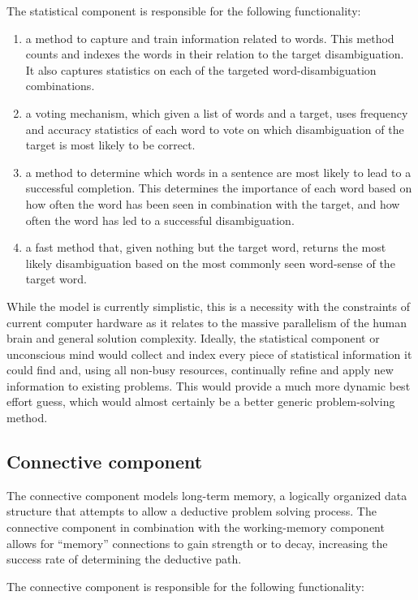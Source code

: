 The statistical component is responsible for the following functionality:

\begin{enumerate}     
	\item a method to capture and train information related to words.  
	This method counts and indexes the words in their relation to the 
	target disambiguation. It also captures statistics on each of the 
	targeted word-disambiguation combinations.     
	\item a voting mechanism, which given a list of words and a target, uses 
	frequency and accuracy statistics of each word to vote on which disambiguation 
	of the target is most likely to be correct.
	\item a method to determine which words in a sentence are most likely to 
	lead to a successful completion.  This determines the importance of each 
	word based on how often the word has been seen in combination with the target,
	and how often the word has led to a successful disambiguation.     
	\item a fast method that, given nothing but the target word, returns the most likely disambiguation based on the most commonly seen word-sense of the target word.
\end{enumerate}

While the model is currently simplistic, this is a necessity with the constraints of current computer
hardware as it relates to the massive parallelism of the human brain and general
solution complexity.  Ideally, the statistical component or unconscious mind
would collect and index every piece of statistical information it could find 
and, using all non-busy resources, continually refine and apply new information
to existing problems.  This would provide a much more dynamic best effort guess, which would almost
certainly be a better generic problem-solving method.

\subsection{Connective component} 

The connective component models long-term
memory, a logically organized data structure that attempts to allow a deductive
problem solving process.  The connective component in combination with the
working-memory component allows for ``memory'' connections to gain strength or
to decay, increasing the success rate of determining the deductive path.

The connective component is responsible for the following functionality:

